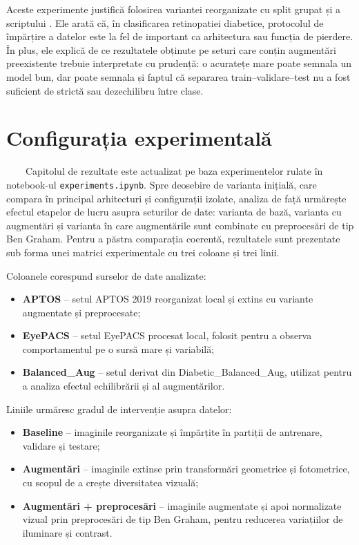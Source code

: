 \documentclass[12pt, a4paper, twoside, romanian]{teza-upb}
\begin{document}
Aceste experimente justifică folosirea variantei reorganizate cu split grupat și a scriptului
. Ele arată că, în
clasificarea retinopatiei diabetice, protocolul de împărțire a datelor este la fel de important ca
arhitectura sau funcția de pierdere. În plus, ele explică de ce rezultatele obținute pe seturi care
conțin augmentări preexistente trebuie interpretate cu prudență: o acuratețe mare poate semnala un
model bun, dar poate semnala și faptul că separarea train--validare--test nu a fost suficient de
strictă sau dezechilibru între clase.

\section{Configurația experimentală}

\ \ \ \ Capitolul de rezultate este actualizat pe baza experimentelor rulate în notebook-ul
\newline \texttt{experiments.ipynb}. Spre deosebire de varianta inițială, care compara în principal
arhitecturi și configurații izolate, analiza de față urmărește efectul etapelor de lucru asupra
seturilor de date: varianta de bază, varianta cu augmentări și varianta în care augmentările sunt
combinate cu preprocesări de tip Ben Graham. Pentru a păstra comparația coerentă, rezultatele sunt
prezentate sub forma unei matrici experimentale cu trei coloane și trei linii.
\bigskip

Coloanele corespund surselor de date analizate:
\begin{itemize}
    \item \textbf{APTOS} -- setul APTOS 2019 reorganizat local și extins cu variante augmentate și preprocesate;
    \item \textbf{EyePACS} -- setul EyePACS procesat local, folosit pentru a observa comportamentul pe o sursă mare și variabilă;
    \item \textbf{Balanced\_Aug} -- setul derivat din Diabetic\_Balanced\_Aug, utilizat pentru a analiza efectul echilibrării și al augmentărilor.
\end{itemize}

Liniile urmăresc gradul de intervenție asupra datelor:
\begin{itemize}
    \item \textbf{Baseline} -- imaginile reorganizate și împărțite în partiții de antrenare, validare și testare;
    \item \textbf{Augmentări} -- imaginile extinse prin transformări geometrice și fotometrice, cu scopul de a crește diversitatea vizuală;
    \item \textbf{Augmentări + preprocesări} -- imaginile augmentate și apoi normalizate vizual prin preprocesări de tip Ben Graham, pentru reducerea variațiilor de iluminare și contrast.
\end{itemize}
\end{document}
